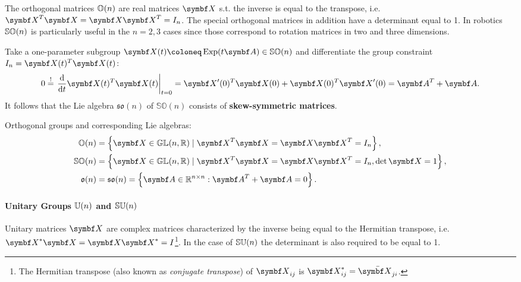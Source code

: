The orthogonal matrices ${\mathbb{O}(n)}$ are real matrices $\X$ s.t. the inverse is equal to the transpose, i.e. $\X^{T} \X = \X \X^{T}= I_{n}$. The special orthogonal matrices in addition have a determinant equal to 1. In robotics ${\mathbb{SO}(n)}$ is particularly useful in the $n=2,3$ cases since those correspond to rotation matrices in two and three dimensions.

Take a one-parameter subgroup $\X(t) \coloneq \Exp(t \A) \in \SOn$ and differentiate the group constraint $I_{n} = \X(t) ^{T} \X(t)$:
\begin{equation}
  0 \overset{!}= \left. \frac{\mathrm{d}}{\mathrm{d} t} \X(t)^T \X(t) \right|_{t=0} = \X'(0)^T \X(0) + \X(0)^T \X'(0) = \A^T + \A.
\end{equation}
It follows that the Lie algebra $\mathfrak{so}(n)$ of $\mathbb{SO}(n)$ consists of \textbf{skew-symmetric matrices}.
\begin{important}
  Orthogonal groups and corresponding Lie algebras:
  \begin{subequations}
    \begin{align}
      \label{eq:On}
      \On             & = \left\{ \X \in \GL(n, \mathbb{R}) \mid \X^{T} \X = \X \X^{T}= I_{n} \right\},              \\
      \label{eq:SOn}
      \SOn            & = \left\{ \X \in \GL(n, \mathbb{R}) \mid \X^{T} \X = \X \X^{T}= I_{n}, \det \X = 1 \right\}, \\
      \label{eq:son}
      \mathfrak{o}(n) & = \mathfrak{so}(n) = \left\{ \A \in \mathbb{R}^{n \times n} : \A^T + \A = 0 \right\}.
    \end{align}
  \end{subequations}
\end{important}

\paragraph{Unitary Groups ${\mathbb{U}(n)}$ and ${\mathbb{SU}(n)}$}

Unitary matrices $\X$ are complex matrices characterized by the inverse being equal to the Hermitian transpose, i.e. $\X^{*} \X = \X \X^{*} = I$\footnote{The Hermitian transpose (also known as \emph{conjugate transpose}) of $\X_{ij}$ is $\X_{ij}^* = \bar {\X_{ji}}$.}. In the case of ${\mathbb{SU}(n)}$ the determinant is also required to be equal to 1.

